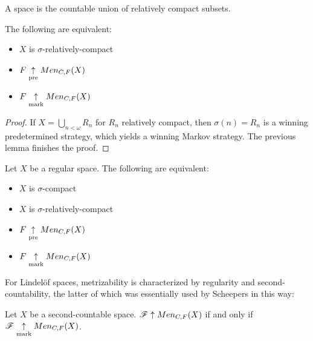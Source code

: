 \begin{defn}
  A  space is the countable union of
  relatively compact subsets.
\end{defn}

\begin{cor}
  The following are equivalent:
  \begin{itemize}
    \item $X$ is $\sigma$-relatively-compact
    \item $F \underset{\text{pre}}{\uparrow} Men_{C,F}(X)$
    \item $F \underset{\text{mark}}{\uparrow} Men_{C,F}(X)$
  \end{itemize}
\end{cor}

\begin{proof}
  If $X=\bigcup_{n<\omega} R_n$ for $R_n$ relatively compact, then
  $\sigma(n)=R_n$ is a winning predetermined strategy, which yields a
  winning Markov strategy. The previous lemma finishes the proof.
\end{proof}

\begin{cor}
  Let $X$ be a regular space. The following are equivalent:
  \begin{itemize}
    \item $X$ is $\sigma$-compact
    \item $X$ is $\sigma$-relatively-compact
    \item $F \underset{\text{pre}}{\uparrow} Men_{C,F}(X)$
    \item $F \underset{\text{mark}}{\uparrow} Men_{C,F}(X)$
  \end{itemize}
\end{cor}

For Lindel\"of spaces, metrizability is characterized by regularity and
second-countability, the latter of which was essentially used by Scheepers in
this way:

\begin{lem}
  Let $X$ be a second-countable space. $\mathscr{F}\uparrow Men_{C,F}(X)$ if and only if
  $\mathscr{F}\underset{\text{mark}}{\uparrow}Men_{C,F}(X)$.
\end{lem}

